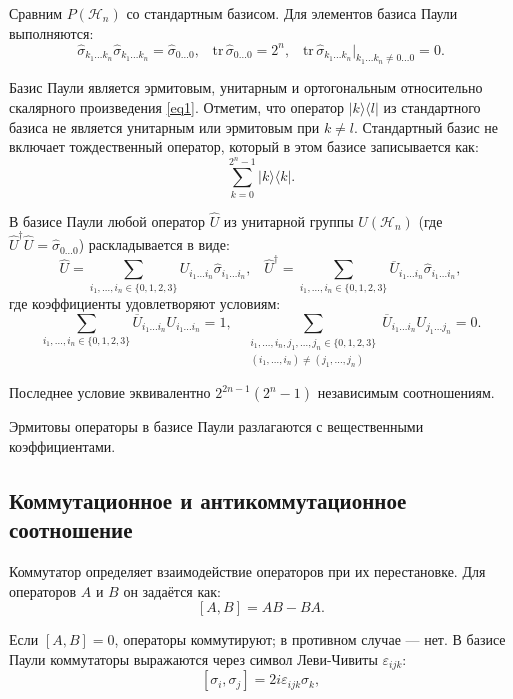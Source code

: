 \documentclass[a4paper]{report}
\begin{document}
Сравним ${P(\mathcal{H}_n)}$ со стандартным базисом. Для элементов базиса Паули выполняются:
\begin{equation}\label{eq4}
    \hat{\sigma}_{k_1\ldots k_n} \hat{\sigma}_{k_1\ldots k_n} = \hat{\sigma}_{0\ldots 0}, \;\;\;
    \mathrm{tr}\,\hat{\sigma}_{0\ldots 0} = 2^n,\;\;\;
    \mathrm{tr}\,\hat{\sigma}_{k_1\ldots k_n}\Big|_{k_1\ldots k_n \neq 0\ldots0} = 0.
\end{equation}

Базис Паули является эрмитовым, унитарным и ортогональным относительно скалярного произведения \eqref{eq1}. Отметим, что оператор ${|k\rangle\langle l|}$ из стандартного базиса не является унитарным или эрмитовым при ${k \neq l}$. Стандартный базис не включает тождественный оператор, который в этом базисе записывается как:
$${
    \sum_{k=0}^{2^n-1} |k\rangle \langle k|.
}$$

В базисе Паули любой оператор ${\hat{U}}$ из унитарной группы ${U(\mathcal{H}_n)}$ (где $\hat{U}^\dagger\hat{U} = \hat{\sigma}_{0\ldots0}$) раскладывается в виде:
$${
    \hat{U} = \sum_{i_1,\ldots,i_n\in\{0,1,2,3\}} U_{i_1\ldots i_n}\hat{\sigma}_{i_1\ldots i_n},\;\;\;
    \hat{U}^\dagger = \sum_{i_1,\ldots,i_n\in\{0,1,2,3\}} \overline{U}_{i_1\ldots i_n}\hat{\sigma}_{i_1\ldots i_n},
}$$
где коэффициенты удовлетворяют условиям:
$${
    \sum_{i_1,\ldots,i_n\in\{0,1,2,3\}} \overline{U}_{i_1\ldots i_n}U_{i_1\ldots i_n} = 1,\;\;\;
    \sum_{\substack{
        i_1,\ldots,i_n,j_1,\ldots,j_n\in\{0,1,2,3\} \\
        (i_1,\ldots,i_n)\neq(j_1,\ldots,j_n)
    }} \overline{U}_{i_1\ldots i_n}U_{j_1\ldots j_n} = 0.
}$$

Последнее условие эквивалентно ${2^{2n-1}(2^n-1)}$ независимым соотношениям.

Эрмитовы операторы в базисе Паули разлагаются с вещественными коэффициентами.


\subsection{Коммутационное и антикоммутационное соотношение}

Коммутатор определяет взаимодействие операторов при их перестановке. Для операторов ${A}$ и ${B}$ он задаётся как:
$${[A, B] = AB - BA.}$$

\noindent Если ${[A, B] = 0}$, операторы коммутируют; в противном случае — нет. В базисе Паули коммутаторы выражаются через символ Леви-Чивиты ${\varepsilon_{ijk}}$:
$${[\sigma_i, \sigma_j] = 2i\varepsilon_{ijk}\sigma_k,}$$
\end{document}
